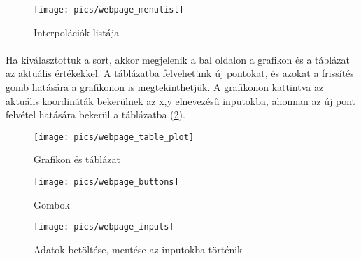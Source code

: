 	\begin{figure}[h]
		\texttt{[image: pics/webpage\_menulist]}
		\centering
		\caption{Interpolációk listája\label{fig:webpage_menulist}}
	\end{figure}
	
	\paragraph{}
	Ha kiválasztottuk a sort, akkor megjelenik a bal oldalon a grafikon és a táblázat az aktuális értékekkel. A táblázatba felvehetünk új pontokat, és azokat a frissítés gomb hatására a grafikonon is megtekinthetjük. A grafikonon kattintva az aktuális koordináták bekerülnek az x,y elnevezésű inputokba, ahonnan az új pont felvétel hatására bekerül a táblázatba (\ref{fig:webpage_table_plot}).

	\begin{figure}[h]
		\texttt{[image: pics/webpage\_table\_plot]}
		\centering
		\caption{Grafikon és táblázat\label{fig:webpage_table_plot}}
	\end{figure}

	\begin{figure}[h]
		\texttt{[image: pics/webpage\_buttons]}
		\centering
		\caption{Gombok\label{fig:webpage_buttons}}
	\end{figure}

	\begin{figure}[h]
		\texttt{[image: pics/webpage\_inputs]}
		\centering
		\caption{Adatok betöltése, mentése az inputokba történik \label{fig:webpage_inputs}}
	\end{figure}

